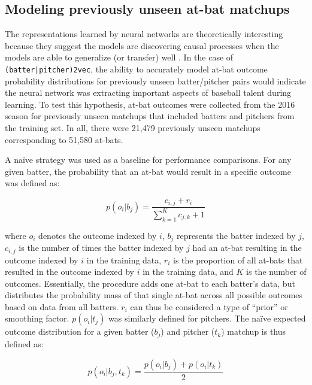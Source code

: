 \documentclass{article}
\begin{document}
\subsection{Modeling previously unseen at-bat matchups}

The representations learned by neural networks are theoretically interesting because they suggest the models are discovering causal processes when the models are able to generalize (or transfer) well \parencite{RepresentationLearning}. In the case of \texttt{(batter|pitcher)2vec}, the ability to accurately model at-bat outcome probability distributions for previously unseen batter/pitcher pairs would indicate the neural network was extracting important aspects of baseball talent during learning. To test this hypothesis, at-bat outcomes were collected from the 2016 season for previously unseen matchups that included batters and pitchers from the training set. In all, there were 21,479 previously unseen matchups corresponding to 51,580 at-bats.

A naïve strategy was used as a baseline for performance comparisons. For any given batter, the probability that an at-bat would result in a specific outcome was defined as:

\begin{equation}
\label{eqn:batter_naïve}
p(o_i|b_j)=\frac{c_{i,j} + r_i}{\sum_{k=1}^{K} c_{j,k} + 1}
\end{equation}

where $o_i$ denotes the outcome indexed by $i$, $b_j$ represents the batter indexed by $j$, $c_{i,j}$ is the number of times the batter indexed by $j$ had an at-bat resulting in the outcome indexed by $i$ in the training data, $r_i$ is the proportion of all at-bats that resulted in the outcome indexed by $i$ in the training data, and $K$ is the number of outcomes. Essentially, the procedure adds one at-bat to each batter's data, but distributes the probability mass of that single at-bat across all possible outcomes based on data from all batters. $r_i$ can thus be considered a type of ``prior'' or smoothing factor. $p(o_i|t_j)$ was similarly defined for pitchers. The naïve expected outcome distribution for a given batter ($b_j$) and pitcher ($t_k$) matchup is thus defined as:

\begin{equation}
\label{eqn:naïve}
p(o_i|b_j,t_k) = \frac{p(o_i|b_j) + p(o_i|t_k)}{2}
\end{equation}
\end{document}

